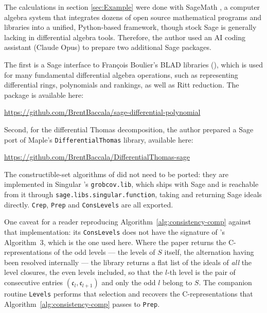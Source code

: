 \documentclass{article}
\theoremstyle{definition}
\theoremstyle{plain}
\begin{document}
The calculations in section \ref{sec:Example} were done with
SageMath \cite{sage}, a computer algebra system that integrates dozens of open source mathematical programs and libraries into
a unified, Python-based framework, though stock Sage is generally lacking in differential algebra tools.  Therefore,
the author used an AI coding assistant (Claude Opus) to prepare two additional Sage packages.

The first is a Sage interface to Fran\c{c}ois Boulier's BLAD libraries (\cite{DifferentialAlgebra}),
which is used for many fundamental differential algebra operations, such
as representing differential rings, polynomials and rankings, as well as Ritt reduction.
The package is available here:

\centerline{\url{https://github.com/BrentBaccala/sage-differential-polynomial}}


Second, for the differential Thomas decomposition, the author prepared a Sage port
of Maple's {\tt DifferentialThomas} library, available here:

\centerline{\url{https://github.com/BrentBaccala/DifferentialThomas-sage}}

The constructible-set algorithms of \cite{BrunatMontes} did not need to be ported:
they are implemented in Singular \cite{DGPS}'s {\tt grobcov.lib}, which ships with
Sage and is reachable from it through {\tt sage.libs.singular.function}, taking and
returning Sage ideals directly.  {\tt Crep}, {\tt Prep} and {\tt ConsLevels} are all
exported.

One caveat for a reader reproducing Algorithm~\ref{alg:consistency-comp} against that
implementation: its {\tt ConsLevels} does not have the signature of
\cite{BrunatMontes}'s Algorithm~3, which is the one used here.  Where the paper
returns the C-representations of the odd levels --- the levels of $S$ itself, the
alternation having been resolved internally --- the library returns a flat list of
the ideals of {\it all} the level closures, the even levels included, so that the
$l$-th level is the pair of consecutive entries $(\mathfrak{c}_l, \mathfrak{c}_{l+1})$
and only the odd $l$ belong to $S$.  The companion routine {\tt Levels} performs that
selection and recovers the C-representations that Algorithm~\ref{alg:consistency-comp}
passes to {\tt Prep}.

\end{document}
